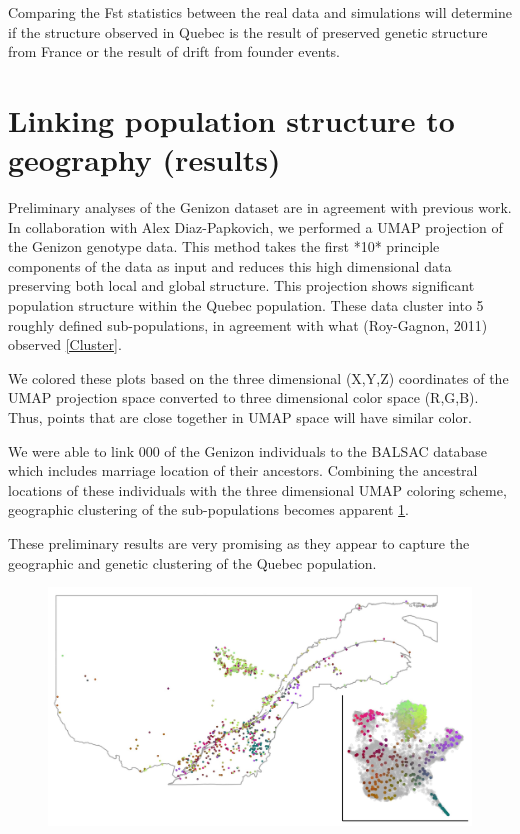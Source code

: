 \documentclass[
11pt, %
oneside, %
english, %
doublespacing, %
headsepline, %
]{MastersDoctoralThesis} %
\begin{document}
Comparing the Fst statistics between the real data and simulations will determine if the structure observed in Quebec is the result of preserved genetic structure from France or the result of drift from founder events.

\section{Linking population structure to geography (results)}
Preliminary analyses of the Genizon dataset are in agreement with previous work.
In collaboration with Alex Diaz-Papkovich, we performed a UMAP projection of the Genizon genotype data.
This method takes the first *10* principle components of the data as input and reduces this high dimensional data preserving both local and global structure.
This projection shows significant population structure within the Quebec population. 
These data cluster into 5 roughly defined sub-populations, in agreement with what (Roy-Gagnon, 2011) observed \ref{Cluster}. 


We colored these plots based on the three dimensional (X,Y,Z) coordinates of the UMAP projection space converted to three dimensional color space (R,G,B).
Thus, points that are close together in UMAP space will have similar color.

We were able to link 000 of the Genizon individuals to the BALSAC database which includes marriage location of their ancestors.
Combining the ancestral locations of these individuals with the three dimensional UMAP coloring scheme, geographic clustering of the sub-populations becomes apparent \ref{UMAP}.  

These preliminary results are very promising as they appear to capture the geographic and genetic clustering of the Quebec population.


\begin{figure}
\includegraphics[width=\hsize,keepaspectratio]{./Figures/Genizon_BalSac_mapsInMaps4.jpg}
\label{UMAP}
\end{figure}
\end{document}
